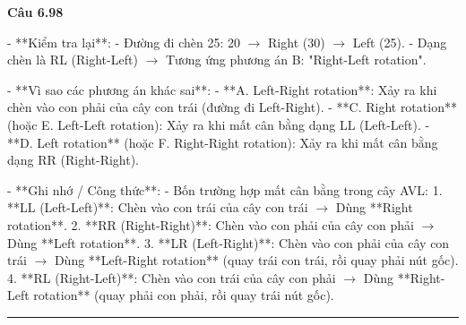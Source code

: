 \documentclass[11pt,a4paper]{article}
\newenvironment{question}[1]{%
  \par\vspace{1em}\noindent\textbf{\large Câu #1}\par\vspace{0.4em}
}{%
  \par\vspace{1em}\hrule\vspace{0.6em}
}
\begin{document}
\begin{question}{6.98}
- **Kiểm tra lại**:
  - Đường đi chèn 25: 20 \(\rightarrow\) Right (30) \(\rightarrow\) Left (25).
  - Dạng chèn là RL (Right-Left) \(\rightarrow\) Tương ứng phương án B: "Right-Left rotation".

- **Vì sao các phương án khác sai**:
  - **A. Left-Right rotation**: Xảy ra khi chèn vào con phải của cây con trái (đường đi Left-Right).
  - **C. Right rotation** (hoặc E. Left-Left rotation): Xảy ra khi mất cân bằng dạng LL (Left-Left).
  - **D. Left rotation** (hoặc F. Right-Right rotation): Xảy ra khi mất cân bằng dạng RR (Right-Right).

- **Ghi nhớ / Công thức**:
  - Bốn trường hợp mất cân bằng trong cây AVL:
    1. **LL (Left-Left)**: Chèn vào con trái của cây con trái \(\rightarrow\) Dùng **Right rotation**.
    2. **RR (Right-Right)**: Chèn vào con phải của cây con phải \(\rightarrow\) Dùng **Left rotation**.
    3. **LR (Left-Right)**: Chèn vào con phải của cây con trái \(\rightarrow\) Dùng **Left-Right rotation** (quay trái con trái, rồi quay phải nút gốc).
    4. **RL (Right-Left)**: Chèn vào con trái của cây con phải \(\rightarrow\) Dùng **Right-Left rotation** (quay phải con phải, rồi quay trái nút gốc).
\end{question}
\end{document}
